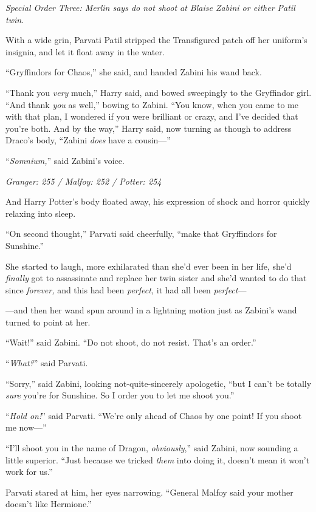 \emph{Special Order Three: Merlin says do not shoot at Blaise Zabini or either Patil twin.}

With a wide grin, Parvati Patil stripped the Transfigured patch off her uniform’s insignia, and let it float away in the water.

“Gryffindors for Chaos,” she said, and handed Zabini his wand back.

“Thank you \emph{very} much,” Harry said, and bowed sweepingly to the Gryffindor girl. “And thank \emph{you} as well,” bowing to Zabini. “You know, when you came to me with that plan, I wondered if you were brilliant or crazy, and I’ve decided that you’re both. And by the way,” Harry said, now turning as though to address Draco’s body, “Zabini \emph{does} have a cousin—”

“\emph{Somnium,}” said Zabini’s voice.

\later

\emph{Granger: 255 / Malfoy: 252 / Potter: 254}

And Harry Potter’s body floated away, his expression of shock and horror quickly relaxing into sleep.

“On second thought,” Parvati said cheerfully, “make that Gryffindors for Sunshine.”

She started to laugh, more exhilarated than she’d ever been in her life, she’d \emph{finally} got to assassinate and replace her twin sister and she’d wanted to do that since \emph{forever,} and this had been \emph{perfect,} it had all been \emph{perfect}—

—and then her wand spun around in a lightning motion just as Zabini’s wand turned to point at her.

“Wait!” said Zabini. “Do not shoot, do not resist. That’s an order.”

“\emph{What?}” said Parvati.

“Sorry,” said Zabini, looking not-quite-sincerely apologetic, “but I can’t be totally \emph{sure} you’re for Sunshine. So I order you to let me shoot you.”

“\emph{Hold on!}” said Parvati. “We’re only ahead of Chaos by one point! If you shoot me now—”

“I’ll shoot you in the name of Dragon, \emph{obviously},” said Zabini, now sounding a little superior. “Just because we tricked \emph{them} into doing it, doesn’t mean it won’t work for us.”

Parvati stared at him, her eyes narrowing. “General Malfoy said your mother doesn’t like Hermione.”

